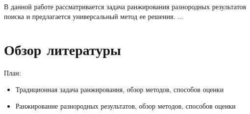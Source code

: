 \documentclass[12pt,a4paper]{report}
\begin{document}








В данной работе рассматривается задача ранжирования разнородных результатов поиска и предлагается универсальный метод ее решения. ...

\chapter{Обзор литературы}

План:

\begin{itemize}
  \item Традиционная задача ранжирования, обзор методов, способов оценки
  \item Ранжирование разнородных результатов, обзор методов, способов оценки
\end{itemize}
\end{document}
